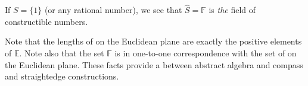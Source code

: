 \documentclass[12pt]{article}
\begin{document}
If $S=\lbrace 1\rbrace$ (or any rational number), we see that $\hat{S}=\mathbb{F}$ is \emph{the} field of constructible numbers.

Note that the lengths of  on the Euclidean plane are exactly the positive elements of $\mathbb{E}$.  Note also that the set $\mathbb{F}$ is in one-to-one correspondence with the set of  on the Euclidean plane.  These facts provide a  between abstract algebra and compass and straightedge constructions.
\end{document}
